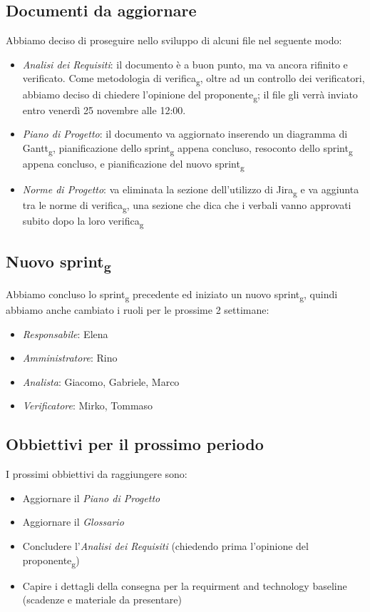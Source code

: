 \subsection{Documenti da aggiornare}
Abbiamo deciso di proseguire nello sviluppo di alcuni file nel seguente modo:
\begin{itemize}
	\item \textit{Analisi dei Requisiti}: il documento è a buon punto, ma va ancora rifinito e verificato. Come metodologia di verifica\textsubscript{g}, oltre ad un controllo dei verificatori, abbiamo deciso di chiedere l'opinione del proponente\textsubscript{g}; il file gli verrà inviato entro venerdì 25 novembre alle 12:00.
	\item \textit{Piano di Progetto}: il documento va aggiornato inserendo un diagramma di Gantt\textsubscript{g}, pianificazione dello sprint\textsubscript{g} appena concluso, resoconto dello sprint\textsubscript{g} appena concluso, e pianificazione del nuovo sprint\textsubscript{g}
	\item \textit{Norme di Progetto}: va eliminata la sezione dell'utilizzo di Jira\textsubscript{g} e va aggiunta tra le norme di verifica\textsubscript{g}, una sezione che dica che i verbali vanno approvati subito dopo la loro verifica\textsubscript{g}
\end{itemize}

\subsection{Nuovo sprint\textsubscript{g}}
Abbiamo concluso lo sprint\textsubscript{g} precedente ed iniziato un nuovo sprint\textsubscript{g}, quindi abbiamo anche cambiato i ruoli per le prossime 2 settimane:
\begin{itemize}
\item \textit{Responsabile}: Elena
\item \textit{Amministratore}: Rino
\item \textit{Analista}: Giacomo, Gabriele, Marco
\item \textit{Verificatore}: Mirko, Tommaso
\end{itemize}

\subsection{Obbiettivi per il prossimo periodo}
I prossimi obbiettivi da raggiungere sono:
\begin{itemize}
\item Aggiornare il \textit{Piano di Progetto}
\item Aggiornare il \textit{Glossario}
\item Concludere l'\textit{Analisi dei Requisiti} (chiedendo prima l'opinione del proponente\textsubscript{g})
\item Capire i dettagli della consegna per la requirment and technology baseline (scadenze e materiale da presentare)
\end{itemize}

